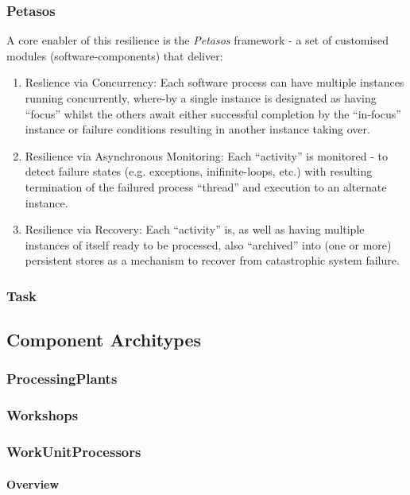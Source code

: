 \documentclass[a4paper]{book}
\begin{document}
\subsubsection{Petasos}

A core enabler of this resilience is the \textit{Petasos} framework - a set of customised modules (software-components) that deliver:
\begin{enumerate}
    \item{\textcolor{OliveGreen}{Reslience via Concurrency:}} Each software process can have multiple instances running concurrently, where-by a single instance is designated as having ``focus'' whilst the others await either successful completion by the ``in-focus'' instance or failure conditions resulting in another instance taking over.
    \item{\textcolor{OliveGreen}{Resilience via Asynchronous Monitoring:}} Each ``activity'' is monitored - to detect failure states (e.g. exceptions, inifinite-loops, etc.) with resulting termination of the failured process ``thread'' and execution to an alternate instance.
    \item{\textcolor{OliveGreen}{Resilience via Recovery:}} Each ``activity'' is, as well as having multiple instances of itself ready to be processed, also ``archived'' into (one or more) persistent stores as a mechanism to recover from catastrophic system failure.
 \end{enumerate}
\subsubsection{Task}

\subsection{Component Architypes}
\subsubsection{ProcessingPlants}
\subsubsection{Workshops}

\subsubsection{WorkUnitProcessors}

\paragraph{Overview}
\end{document}
